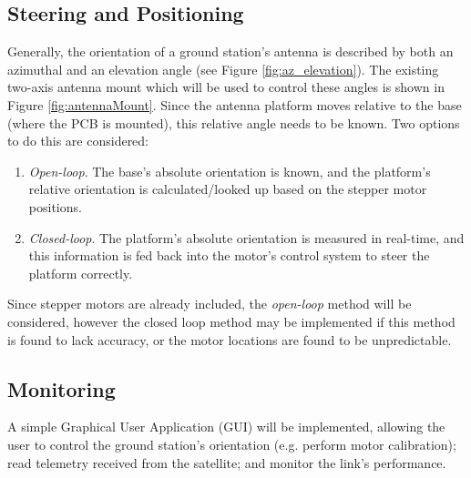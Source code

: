 \subsection{Steering and Positioning}\label{sec:gs_steering_positioning}

Generally, the orientation of a ground station's antenna is described by both an azimuthal and an elevation angle (see Figure \ref{fig:az_elevation}). The existing two-axis antenna mount which will be used to control these angles is shown in Figure \ref{fig:antennaMount}. Since the antenna platform moves relative to the base (where the PCB is mounted), this relative angle needs to be known. Two options to do this are considered:
\begin{enumerate}
    \item \textit{Open-loop}. The base's absolute orientation is known, and the platform's relative orientation is calculated/looked up based on the stepper motor positions.
    \item \textit{Closed-loop}. The platform's absolute orientation is measured in real-time, and this information is fed back into the motor's control system to steer the platform correctly.
\end{enumerate}

Since stepper motors are already included, the \textit{open-loop} method will be considered, however the closed loop method may be implemented if this method is found to lack accuracy, or the motor locations are found to be unpredictable.

\subsection{Monitoring}
A simple Graphical User Application (GUI) will be implemented, allowing the user to control the ground station's orientation (e.g. perform motor calibration); read telemetry received from the satellite; and monitor the link's performance.